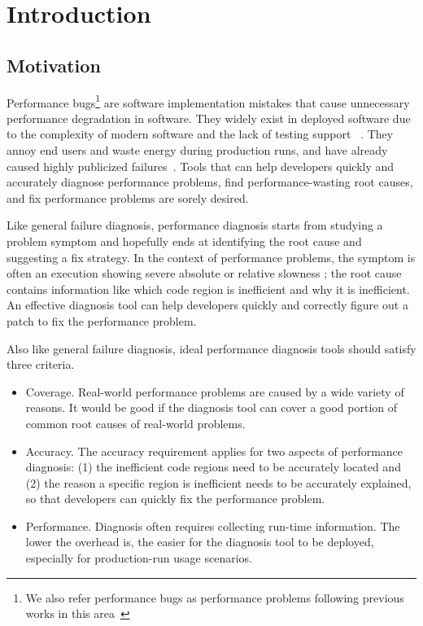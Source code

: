 \section{Introduction}
\label{sec:intro}
\subsection{Motivation}

Performance bugs\footnote{We also refer performance bugs as performance problems
following previous works in this area~\cite{PerfBug,Alabama,SongOOPSLA2014}} 
are software implementation mistakes that cause unnecessary performance
degradation in software. They widely exist in deployed software due to the 
complexity of modern software and the lack of testing support
~\cite{s2e,PerfBug,perf.fse10,rily.perftest,perfantipattern,xiao13:context}. 
They annoy end users and waste energy during production runs, and 
have already caused highly publicized failures~\cite{ACA-health,colorado}.
Tools that can help
developers quickly and accurately diagnose performance problems,
find performance-wasting root causes, and fix performance problems
are sorely desired. 

Like general failure diagnosis, 
performance diagnosis starts from studying a problem symptom and hopefully ends
at identifying the root cause and suggesting a fix strategy. 
In the context of performance problems,
the symptom is often
an execution showing severe absolute or
relative slowness \cite{SongOOPSLA2014}; the root cause contains 
information like which code region is inefficient and why
it is inefficient. An effective diagnosis tool can help developers quickly
and correctly figure out a patch to fix the performance problem.

Also like general failure diagnosis, ideal performance diagnosis tools should
satisfy three criteria.
\begin{itemize}
\item Coverage. 
Real-world performance problems are caused by a wide variety of reasons. It 
would be good if the diagnosis tool can cover a good portion of common
root causes of real-world problems.

\item Accuracy. 
The accuracy requirement applies for two aspects of performance diagnosis: (1)
the inefficient code regions need to be accurately located and (2)
the reason a specific region is inefficient needs to be accurately
explained, so that developers can quickly fix the performance problem.

\item Performance. 
Diagnosis often requires collecting run-time information. The lower the overhead
is, the easier for the diagnosis tool to be deployed, especially for 
production-run usage scenarios. 
\end{itemize}

